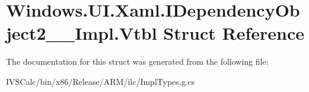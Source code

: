 \hypertarget{struct_windows_1_1_u_i_1_1_xaml_1_1_i_dependency_object2_____impl_1_1_vtbl}{}\section{Windows.\+U\+I.\+Xaml.\+I\+Dependency\+Object2\+\_\+\+\_\+\+Impl.\+Vtbl Struct Reference}
\label{struct_windows_1_1_u_i_1_1_xaml_1_1_i_dependency_object2_____impl_1_1_vtbl}


The documentation for this struct was generated from the following file\+:\begin{DoxyCompactItemize}
\item 
I\+V\+S\+Calc/bin/x86/\+Release/\+A\+R\+M/ilc/Impl\+Types.\+g.\+cs\end{DoxyCompactItemize}
